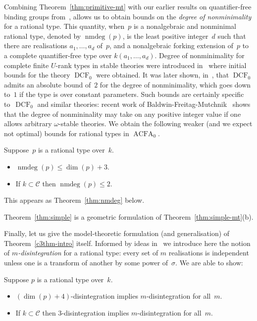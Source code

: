 \documentclass[\DocOpts]{amsart}
\theoremstyle{definition}
\newenvironment{customthm}[1]
  {\renewcommand\theinnercustomthm{#1}\innercustomthm}
  {\endinnercustomthm}
\def\dcf{\operatorname{DCF}}
\def\acfa{\operatorname{ACFA}}
\def\nmdeg{\operatorname{nmdeg}}
\def\C{\mathcal{C}}
\newcommand{\<}{\langle}
\renewcommand{\>}{\rangle}
\begin{document}
Combining Theorem~\ref{thm:primitive-mt} with our earlier results on quantifier-free binding groups from~\cite{qfint}, allows us to obtain bounds on the {\em degree of nonminimality} for a rational type.
This quantity, when~$p$ is a nonalgebraic and nonminimal rational type, denoted by $\nmdeg(p)$, is the least positive integer~$d$ such that there are realisations $a_1,\dots,a_d$ of~$p$, and a nonalgebraic forking extension of~$p$ to a complete quantifier-free type over $k(a_1,\dots,a_d)$.
Degree of nonminimality for complete finite $U$-rank types in stable theories were introduced in~\cite{nmdeg} where initial bounds for the theory $\dcf_0$ were obtained.
It was later shown, in~\cite{nmdeg2}, that $\dcf_0$ admits an absolute bound of~$2$ for the degree of nonminimality, which goes down to~$1$ if the type is over constant parameters.
Such bounds are certainly specific to~$\dcf_0$ and similar theories: recent work of Baldwin-Freitag-Mutchnik~\cite{bfm} shows that the degree of nonmininality may take on any positive integer value if one allows arbitrary $\omega$-stable theories.
We obtain the following weaker (and we expect not optimal) bounds for rational types in $\acfa_0$.

\begin{customthm}{5}
\label{thm:simple-mt}
Suppose~$p$ is a rational type over~$k$.
\begin{itemize}
\item[(a)]
$\nmdeg(p)\leq\dim(p)+3$.
\item[(b)]
If $k\subset\C$ then $\nmdeg(p)\leq 2$.
\end{itemize}
\end{customthm}

This appears as Theorem~\ref{thm:nmdeg} below.

Theorem~\ref{thm:simple} is a geometric formulation of Theorem~\ref{thm:simple-mt}(b).

Finally, let us give the model-theoretic formulation (and generalisation) of Theorem~\ref{c3thm-intro} itself.
Informed by ideas in~\cite{c3} we introduce here the notion of {\em $m$-disintegration} for a rational type: every set of $m$ realisations is independent unless one is a transform of another by some power of~$\sigma$.
We are able to show:

\begin{customthm}{6}\label{d3-intro}
Suppose $p$ is a rational type over~$k$.
\begin{itemize}
\item[(a)]
$(\dim(p)+4)$-disintegration implies $m$-disintegration for all~$m$.
\item[(b)]
If $k\subset\C$ then $3$-disintegration implies $m$-disintegration for all~$m$.
\end{itemize}
\end{customthm}
\end{document}
